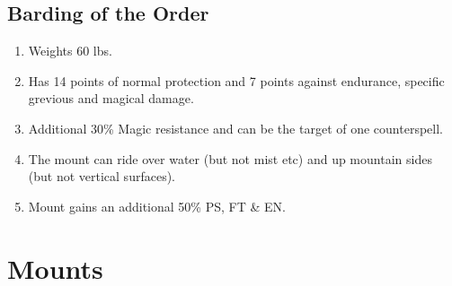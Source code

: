 \documentclass[a4paper]{article}
\begin{document}
\begin{multicols*}{3}
\subsection{Barding of the Order}

\begin{enumerate}
\item Weights 60 lbs.
\item Has 14 points of normal protection and 7 points against
endurance, specific grevious and magical damage.
\item Additional 30\% Magic resistance and can be the target of one counterspell.
\item The mount can ride over water (but not mist etc) and up mountain
sides (but not vertical surfaces).
\item Mount gains an additional 50\% PS, FT \& EN.
\end{enumerate}

\end{multicols*}

\section*{Mounts}
\end{document}
